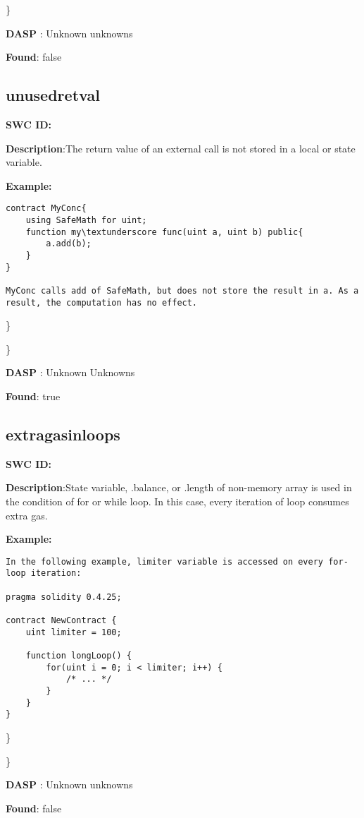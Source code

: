 \documentclass{article}
\begin{document}
\} 

\textbf{DASP} : Unknown unknowns

\textbf{Found}: false

\subsection{unused\textunderscore retval} 
\textbf{SWC \textunderscore ID:} 

\textbf{Description}:The return value of an external call is not stored in a local or state variable.


\textbf{Example:} 
\begin{verbatim}
contract MyConc{
    using SafeMath for uint;
    function my\textunderscore func(uint a, uint b) public{
        a.add(b);
    }
}

MyConc calls add of SafeMath, but does not store the result in a. As a result, the computation has no effect.

\end{verbatim}\} 

\} 

\textbf{DASP} : Unknown Unknowns

\textbf{Found}: true

\subsection{extra\textunderscore gas\textunderscore in\textunderscore loops} 
\textbf{SWC \textunderscore ID:} 

\textbf{Description}:State variable, .balance, or .length of non-memory array is used in the condition of for or while loop. In this case, every iteration of loop consumes extra gas.


\textbf{Example:} 
\begin{verbatim}
In the following example, limiter variable is accessed on every for-loop iteration:

pragma solidity 0.4.25;

contract NewContract {
    uint limiter = 100;

    function longLoop() {
        for(uint i = 0; i < limiter; i++) {
            /* ... */
        }
    }
}

\end{verbatim}\} 

\} 

\textbf{DASP} : Unknown unknowns

\textbf{Found}: false
\end{document}
